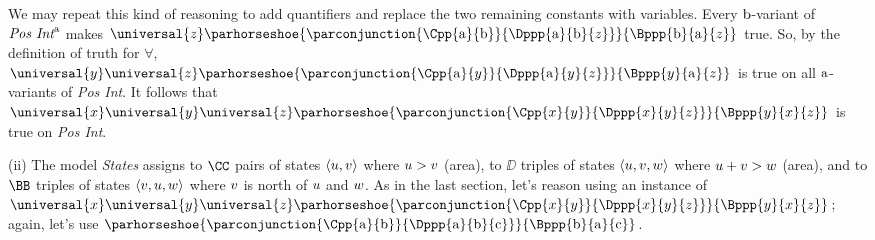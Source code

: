 \begin{PROOF}
We may repeat this kind of reasoning to add quantifiers and replace the two remaining constants with variables.   Every $\mathrm{b}$-variant of $\emph{Pos Int}^{\mathrm{a}}$ makes $\universal{\variable{z}}\parhorseshoe{\parconjunction{\Cpp{\constant{a}}{\constant{b}}}{\Dppp{\constant{a}}{\constant{b}}{\variable{z}}}}{\Bppp{\constant{b}}{\constant{a}}{\variable{z}}}$ true.  So, by the definition of truth for $\forall$, $\universal{\variable{y}}\universal{\variable{z}}\parhorseshoe{\parconjunction{\Cpp{\constant{a}}{\variable{y}}}{\Dppp{\constant{a}}{\variable{y}}{\variable{z}}}}{\Bppp{\variable{y}}{\constant{a}}{\variable{z}}}$ is true on all $\mathrm{a}$-variants of \emph{Pos Int}.  It follows that $\universal{\variable{x}}\universal{\variable{y}}\universal{\variable{z}}\parhorseshoe{\parconjunction{\Cpp{\variable{x}}{\variable{y}}}{\Dppp{\variable{x}}{\variable{y}}{\variable{z}}}}{\Bppp{\variable{y}}{\variable{x}}{\variable{z}}}$ is true on \emph{Pos Int}.

\bigskip

(ii) The model \emph{States} assigns to $\CC$ pairs of states $\langle u,v\rangle$ where $u>v$ (area), to $\DD$ triples of states $\langle u,v,w\rangle$ where $u+v>w$ (area), and to $\BB$ triples of states $\langle v,u,w\rangle$ where $v$ is north of $u$ and $w$.  As in the last section, let's reason using an instance of $\universal{\variable{x}}\universal{\variable{y}}\universal{\variable{z}}\parhorseshoe{\parconjunction{\Cpp{\variable{x}}{\variable{y}}}{\Dppp{\variable{x}}{\variable{y}}{\variable{z}}}}{\Bppp{\variable{y}}{\variable{x}}{\variable{z}}}$; again, let's use $\parhorseshoe{\parconjunction{\Cpp{\constant{a}}{\constant{b}}}{\Dppp{\constant{a}}{\constant{b}}{\constant{c}}}}{\Bppp{\constant{b}}{\constant{a}}{\constant{c}}}$.


\end{PROOF}
